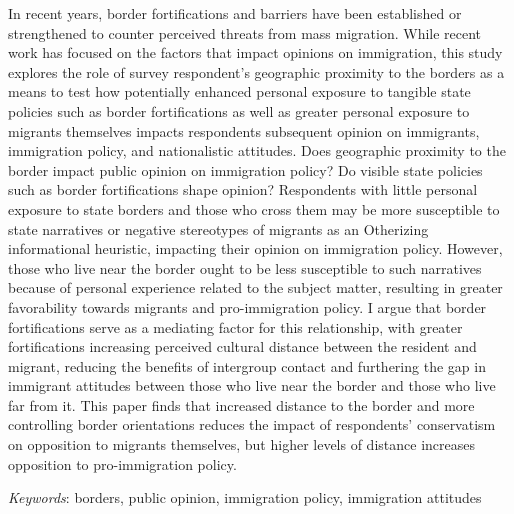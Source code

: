 \documentclass[12pt,]{article}
\renewenvironment{abstract}
 {{%
    \setlength{\leftmargin}{0mm}
    \setlength{\rightmargin}{\leftmargin}%
  }%
  \relax}
 {\endlist}
\begin{document}
\begin{abstract}

    \hbox{\vrule height .2pt width 39.14pc}

    \vskip 8.5pt %

\noindent In recent years, border fortifications and barriers have been
established or strengthened to counter perceived threats from mass
migration. While recent work has focused on the factors that impact
opinions on immigration, this study explores the role of survey
respondent's geographic proximity to the borders as a means to test how
potentially enhanced personal exposure to tangible state policies such
as border fortifications as well as greater personal exposure to
migrants themselves impacts respondents subsequent opinion on
immigrants, immigration policy, and nationalistic attitudes. Does
geographic proximity to the border impact public opinion on immigration
policy? Do visible state policies such as border fortifications shape
opinion? Respondents with little personal exposure to state borders and
those who cross them may be more susceptible to state narratives or
negative stereotypes of migrants as an Otherizing informational
heuristic, impacting their opinion on immigration policy. However, those
who live near the border ought to be less susceptible to such narratives
because of personal experience related to the subject matter, resulting
in greater favorability towards migrants and pro-immigration policy. I
argue that border fortifications serve as a mediating factor for this
relationship, with greater fortifications increasing perceived cultural
distance between the resident and migrant, reducing the benefits of
intergroup contact and furthering the gap in immigrant attitudes between
those who live near the border and those who live far from it. This
paper finds that increased distance to the border and more controlling
border orientations reduces the impact of respondents' conservatism on
opposition to migrants themselves, but higher levels of distance
increases opposition to pro-immigration policy.


\vskip 8.5pt \noindent \emph{Keywords}: borders, public opinion,
immigration policy, immigration attitudes \par

    \hbox{\vrule height .2pt width 39.14pc}



\end{abstract}


\vskip 6.5pt
\end{document}

